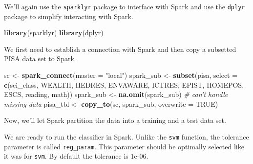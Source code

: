 \documentclass[]{book}
\newenvironment{Shaded}{\begin{snugshade}}{\end{snugshade}}
\newcommand{\CommentTok}[1]{\textcolor[rgb]{0.56,0.35,0.01}{\textit{#1}}}
\newcommand{\DataTypeTok}[1]{\textcolor[rgb]{0.13,0.29,0.53}{#1}}
\newcommand{\DecValTok}[1]{\textcolor[rgb]{0.00,0.00,0.81}{#1}}
\newcommand{\KeywordTok}[1]{\textcolor[rgb]{0.13,0.29,0.53}{\textbf{#1}}}
\newcommand{\NormalTok}[1]{#1}
\newcommand{\OperatorTok}[1]{\textcolor[rgb]{0.81,0.36,0.00}{\textbf{#1}}}
\newcommand{\OtherTok}[1]{\textcolor[rgb]{0.56,0.35,0.01}{#1}}
\newcommand{\StringTok}[1]{\textcolor[rgb]{0.31,0.60,0.02}{#1}}
\begin{document}
We'll again use the \texttt{sparklyr} package to interface with Spark and use the \texttt{dplyr} package to simplify interacting with Spark.

\begin{Shaded}
\begin{Highlighting}[]
\KeywordTok{library}\NormalTok{(sparklyr)}
\KeywordTok{library}\NormalTok{(dplyr)}
\end{Highlighting}
\end{Shaded}

We first need to establish a connection with Spark and then copy a subsetted PISA data set to Spark.

\begin{Shaded}
\begin{Highlighting}[]
\NormalTok{sc <-}\StringTok{ }\KeywordTok{spark_connect}\NormalTok{(}\DataTypeTok{master =} \StringTok{"local"}\NormalTok{)}
\NormalTok{spark_sub <-}\StringTok{ }\KeywordTok{subset}\NormalTok{(pisa, }
                    \DataTypeTok{select =} \KeywordTok{c}\NormalTok{(sci_class, WEALTH, HEDRES, ENVAWARE, ICTRES,}
\NormalTok{                               EPIST, HOMEPOS, ESCS, reading, math))}
\NormalTok{spark_sub <-}\StringTok{ }\KeywordTok{na.omit}\NormalTok{(spark_sub) }\CommentTok{# can't handle missing data}
\NormalTok{pisa_tbl <-}\StringTok{ }\KeywordTok{copy_to}\NormalTok{(sc, spark_sub, }\DataTypeTok{overwrite =} \OtherTok{TRUE}\NormalTok{)}
\end{Highlighting}
\end{Shaded}

Now, we'll let Spark partition the data into a training and a test data set.

\begin{Shaded}
\end{Shaded}

We are ready to run the classifier in Spark. Unlike the \texttt{svm} function, the tolerance parameter is called \texttt{reg\_param}. This parameter should be optimally selected like it was for \texttt{svm}. By default the tolerance is 1e-06.
\end{document}
